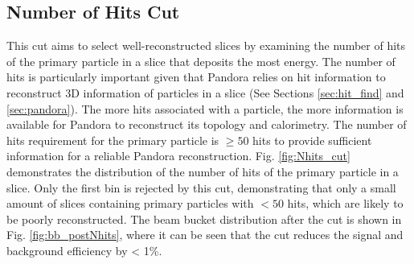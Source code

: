 \subsection{Number of Hits Cut}
\label{sec:hit_cut}

This cut aims to select well-reconstructed slices by examining the number of hits of the primary particle in a slice that deposits the most energy.
The number of hits is particularly important given that Pandora relies on hit information to reconstruct 3D information of particles in a slice (See Sections \ref{sec:hit_find} and \ref{sec:pandora}).
The more hits associated with a particle, the more information is available for Pandora to reconstruct its topology and calorimetry.
The number of hits requirement for the primary particle is $\geq 50$ hits to provide sufficient information for a reliable Pandora reconstruction.
Fig. \ref{fig:Nhits_cut} demonstrates the distribution of the number of hits of the primary particle in a slice. 
Only the first bin is rejected by this cut, demonstrating that only a small amount of slices containing primary particles with $< 50$ hits, which are likely to be poorly reconstructed.
The beam bucket distribution after the cut is shown in Fig. \ref{fig:bb_postNhits}, where it can be seen that the cut reduces the signal and background efficiency by < 1\%.



